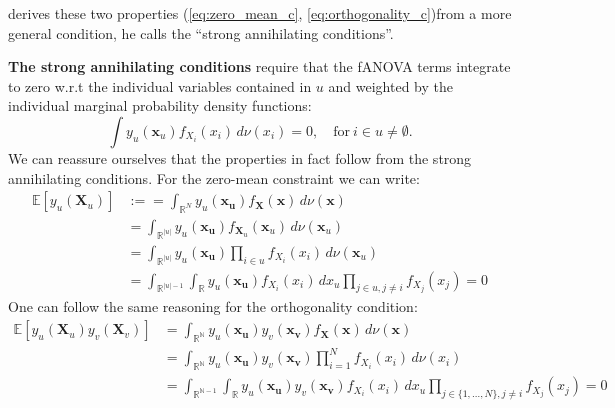 \cite{rahman2014} derives these two properties (\autoref{eq:zero_mean_c}, \autoref{eq:orthogonality_c})from a more general condition, he calls the ``strong annihilating conditions''.\par
\textbf{The strong annihilating conditions} require that the fANOVA terms integrate to zero w.r.t the individual variables contained in $u$ and weighted by the individual marginal probability density functions:
\begin{equation}
    \int y_u(\boldsymbol{x}_u) f_{X_i}(x_i) \, d\nu(x_i) = 0, \quad \text{for} \ i \in u \neq \emptyset.
    \label{eq:strong_annihilating_conditions}
\end{equation}
We can reassure ourselves that the properties in fact follow from the strong annihilating conditions. For the zero-mean constraint we can write:
\begin{align*}
    \mathbb{E}[y_u(\boldsymbol{X}_u)] &:= = \int_{\mathbb{R}^{N}} y_u(\boldsymbol{x_u}) f_{\boldsymbol{X}}(\boldsymbol{x}) \, d\nu (\boldsymbol{x}) \\
    &= \int_{\mathbb{R}^{|u|}} y_u(\boldsymbol{x_u}) f_{\boldsymbol{X}_u}(\boldsymbol{x}_u) \, d\nu (\boldsymbol{x}_u) \\
    &= \int_{\mathbb{R}^{|u|}} y_u(\boldsymbol{x_u}) \prod_{i \in u} f_{X_i}(x_i) \, d\nu (\boldsymbol{x}_u) \\
    &= \int_{\mathbb{R}^{|u|-1}} \int_{\mathbb{R}} y_u(\boldsymbol{x_u}) f_{X_i}(x_i) \, dx_u \prod_{j \in u, j \neq i} f_{X_j}(x_j) = 0
\end{align*}
One can follow the same reasoning for the orthogonality condition:
\begin{align*}
    \mathbb{E}[y_u(\boldsymbol{X}_u) y_v(\boldsymbol{X}_v)] &= \int_{\mathbb{R}^{\mathbb{N}}} y_u(\boldsymbol{x_u}) y_v(\boldsymbol{x_v}) f_{\boldsymbol{X}}(\boldsymbol{x}) \, d\nu (\boldsymbol{x}) \\
    &= \int_{\mathbb{R}^{\mathbb{N}}} y_u(\boldsymbol{x_u}) y_v(\boldsymbol{x_v}) \prod_{i=1}^{N} f_{X_i}(x_i) \, d\nu (x_i) \\
    &= \int_{\mathbb{R}^{\mathbb{N}-1}} \int_{\mathbb{R}} y_u(\boldsymbol{x_u}) y_v(\boldsymbol{x_v}) f_{X_i}(x_i) \, dx_u \prod_{j \in \{1, \dots, N\}, j \neq i} f_{X_j}(x_j) = 0
\end{align*}


